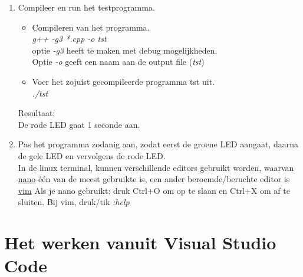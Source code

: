 \begin{enumerate}
\begin{lstlisting}[caption=Zet LED aan en uit,frame=tlrb,label={lst:mainLd}]{Name}
	cout<<"Hi NSE"<<endl;
	int b=zetPinOpOutput(RODELED);//return waarde of het gelukt is.
	if(b == 0)  {  //if(!b) mag ook. 
		cout<<"Foutje bedankt"<<endl;
		return 0;
	}
	cout<<"b= "<<b<<endl;//return waarde of het gelukt is.
	b=zetPinWaarde(RODELED,1);  //Zet de rode LED aan.
	usleep(1000000);
	b=zetPinWaarde(RODELED,0);  //Zet de rode LED uit.
	cout<<"einde"<<endl;
}
\end{lstlisting}
   \item Compileer en run het testprogramma.
\begin{itemize}
	\item Compileren van het programma. \\\textit{g++ -g3 *.cpp -o tst}\\
	optie \textit{-g3} heeft te maken met debug mogelijkheden. \\
	Optie \textit{-o} geeft een naam aan de output file (\textit{tst})
	\item Voer het zojuist gecompileerde programma tst uit.\\\textit{./tst}  
	
\end{itemize}
Resultaat:\\	
De rode LED gaat 1 seconde aan.

\item Pas het programma zodanig aan, zodat eerst de groene LED aangaat, daarna de gele LED en vervolgens de rode LED. \\
In de linux terminal, kunnen verschillende editors gebruikt worden, waarvan \href{https://linuxize.com/post/how-to-use-nano-text-editor/}{nano} \'{e}\'{e}n van de meest gebruikte is, een ander beroemde/beruchte editor is \href{https://opensource.com/article/19/3/getting-started-vim}{vim}  
Als je nano gebruikt: druk Ctrl+O om op te slaan en Ctrl+X om af te sluiten. Bij vim, druk/tik \textit{:help}
\end{enumerate}

\section{Het werken vanuit Visual Studio Code}


